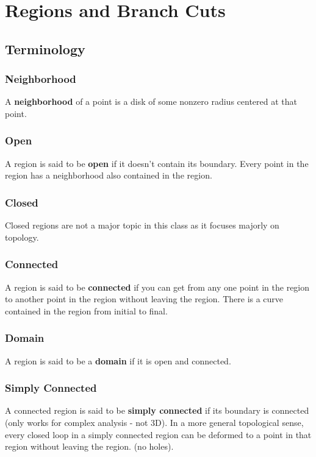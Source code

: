\documentclass[../main.tex]{subfiles}
\begin{document}
\chapter{Regions and Branch Cuts}
\section{Terminology}
    \subsection{Neighborhood}
        A \textbf{neighborhood} of a point is a disk of some nonzero radius centered at that point.
    
    \subsection{Open}
        A region is said to be \textbf{open} if it doesn't contain its boundary.
        Every point in the region has a neighborhood also contained in the region.
    
    \subsection{Closed}
        Closed regions are not a major topic in this class as it focuses majorly on topology.
    
    \subsection{Connected}
        A region is said to be \textbf{connected} if you can get from any one point in the region to another point in the region without leaving the region.
        There is a curve contained in the region from initial to final.


    \subsection{Domain}
        A region is said to be a \textbf{domain} if it is open and connected.

    \subsection{Simply Connected}
        A connected region is said to be \textbf{simply connected} if its boundary is connected (only works for complex analysis - not 3D).
        In a more general topological sense, every closed loop in a simply connected region can be deformed to a point in that region without leaving the region. (no holes).
\end{document}
